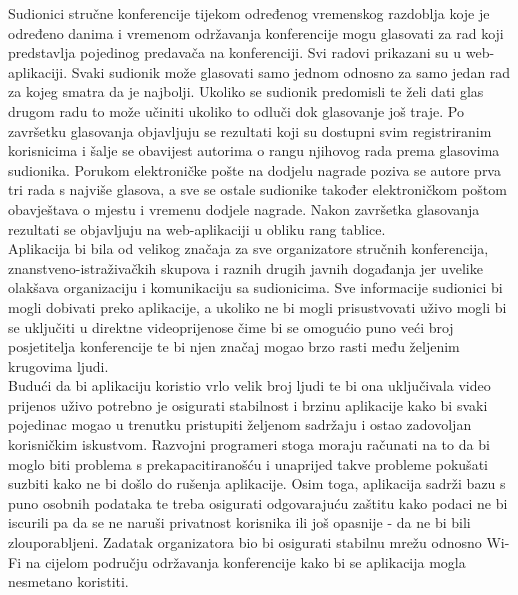 		Sudionici stručne konferencije tijekom određenog vremenskog razdoblja koje je određeno danima i vremenom održavanja konferencije mogu glasovati za rad koji predstavlja pojedinog predavača na konferenciji. Svi radovi prikazani su u web-aplikaciji. Svaki sudionik može glasovati samo jednom odnosno za samo jedan rad za kojeg smatra da je najbolji. Ukoliko se sudionik predomisli te želi dati glas drugom radu to može učiniti ukoliko to odluči dok glasovanje još traje. Po završetku glasovanja objavljuju se rezultati koji su dostupni svim registriranim korisnicima i šalje se obavijest autorima o rangu njihovog rada prema glasovima sudionika. Porukom elektroničke pošte na dodjelu nagrade poziva se autore prva tri rada s najviše glasova, a sve se ostale sudionike također elektroničkom poštom obavještava o mjestu i vremenu dodjele nagrade. Nakon završetka glasovanja rezultati se objavljuju na web-aplikaciji u obliku rang tablice.\\
		
		Aplikacija bi bila od velikog značaja za sve organizatore stručnih konferencija, znanstveno-istraživačkih skupova i raznih drugih javnih događanja jer uvelike olakšava organizaciju i komunikaciju sa sudionicima. Sve informacije sudionici bi mogli dobivati preko aplikacije, a ukoliko ne bi mogli prisustvovati uživo mogli bi se uključiti u direktne videoprijenose čime bi se omogućio puno veći broj posjetitelja konferencije te bi njen značaj mogao brzo rasti među željenim krugovima ljudi.\\
		
		Budući da bi aplikaciju koristio vrlo velik broj ljudi te bi ona uključivala video prijenos uživo potrebno je osigurati stabilnost i brzinu aplikacije kako bi svaki pojedinac mogao u trenutku pristupiti željenom sadržaju i ostao zadovoljan korisničkim iskustvom. Razvojni programeri stoga moraju računati na to da bi moglo biti problema s prekapacitiranošću i unaprijed takve probleme pokušati suzbiti kako ne bi došlo do rušenja aplikacije. Osim toga, aplikacija sadrži bazu s puno osobnih podataka te treba osigurati odgovarajuću zaštitu kako podaci ne bi iscurili pa da se ne naruši privatnost korisnika ili još opasnije - da ne bi bili zlouporabljeni. Zadatak organizatora bio bi osigurati stabilnu mrežu odnosno Wi-Fi na cijelom području održavanja konferencije kako bi se aplikacija mogla nesmetano koristiti.\\
		
